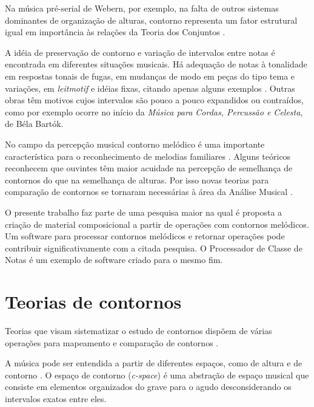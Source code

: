 \documentclass[brazil]{article}
\newcommand{\eng}[1]{\textit{#1}}
\newcommand{\opus}[1]{\textit{#1}}
\begin{document}
Na música pré-serial de Webern, por exemplo, na falta de outros
sistemas dominantes de organização de alturas, contorno representa um
fator estrutural igual em importância às relações da Teoria dos
Conjuntos \cite[p. 157]{clifford95:contour}.

A idéia de preservação de contorno e variação de intervalos entre
notas é encontrada em diferentes situações musicais. Há adequação de
notas à tonalidade em respostas tonais de fugas, em mudanças de modo
em peças do tipo tema e variações, em \eng{leitmotif} e idéias fixas,
citando apenas alguns exemplos
\cite[p. 29]{morris87:composition}. Outras obras têm motivos cujos
intervalos são pouco a pouco expandidos ou contraídos, como por
exemplo ocorre no início da \opus{Música para Cordas, Percussão e
  Celesta}, de Béla Bartók.

No campo da percepção musical contorno melódico é uma importante
característica para o reconhecimento de melodias familiares
\cite[p. 136]{dowling.ea86:music}. Alguns teóricos reconhecem que
ouvintes têm maior acuidade na percepção de semelhança de contornos do
que na semelhança de alturas. Por isso novas teorias para comparação
de contornos se tornaram necessárias à área da Análise Musical
\cite[p. 226]{marvin.ea87:relating}.


O presente trabalho faz parte de uma pesquisa maior na qual é proposta
a criação de material composicional a partir de operações com
contornos melódicos. Um software para processar contornos melódicos e
retornar operações pode contribuir significativamente com a citada
pesquisa. O Processador de Classe de Notas \cite{oliveira01:pcn} é um
exemplo de software criado para o mesmo fim.

\section{Teorias de contornos}
\label{sec:teorias-de-contornos}

Teorias que visam sistematizar o estudo de contornos dispõem de várias
operações para mapeamento e comparação de contornos
\cite{friedmann85:methodology,friedmann87:response,morris87:composition,morris93:directions,marvin.ea87:relating,clifford95:contour,polansky.ea92:possible,quinn97:fuzzy,beard03:contour}.

A música pode ser entendida a partir de diferentes espaços, como de
altura e de contorno \cite{morris87:composition}. O espaço de contorno
(\eng{c-space}) é uma abstração de espaço musical que consiste em
elementos organizados do grave para o agudo desconsiderando os
intervalos exatos entre eles.
\end{document}
